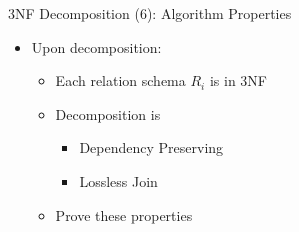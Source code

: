 \documentclass[aspectratio=169, xcolor=dvipsnames]{beamer}
\begin{document}
\begin{frame}{3NF Decomposition (6): Algorithm Properties}
    \begin{itemize}[<+->]
        \item Upon decomposition:
        \begin{itemize}
            \item[$\triangleright$] Each relation schema $R_i$ is in 3NF
            \item[$\triangleright$] Decomposition is
            \begin{itemize}
                \item Dependency Preserving
                \item Lossless Join
            \end{itemize}
            \item[$\triangleright$] Prove these properties
        \end{itemize}
    \end{itemize}
\end{frame}
\end{document}
